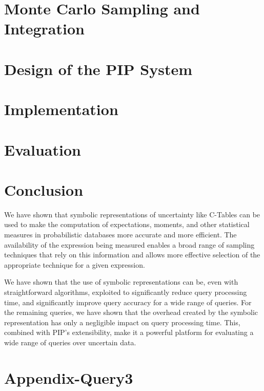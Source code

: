 \documentclass{vldb}
\begin{document}
\section{Monte Carlo Sampling and Integration}
\label{sec:sampling}


\section{Design of the PIP System}
\label{sec:design}


\section{Implementation}
\label{sec:implementation}


\section{Evaluation}
\label{sec:evaluation}



\section{Conclusion}

We have shown that symbolic representations of uncertainty like C-Tables can be used to make the computation of expectations, moments, and other statistical measures in probabilistic databases more accurate and more efficient.  The availability of the expression being measured enables a broad range of sampling techniques that rely on this information and allows more effective selection of the appropriate technique for a given expression.

We have shown that the use of symbolic representations can be, even with straightforward algorithms, exploited to significantly reduce query processing time, and significantly improve query accuracy for a wide range of queries.  For the remaining queries, we have shown that the overhead created by the symbolic representation has only a negligible impact on query processing time.  This, combined with PIP's extensibility, make it a powerful platform for evaluating a wide range of queries over uncertain data.

\section{Appendix-Query3}
\label{sec:timingq3}


\begin{small}


\end{small}
\end{document}
